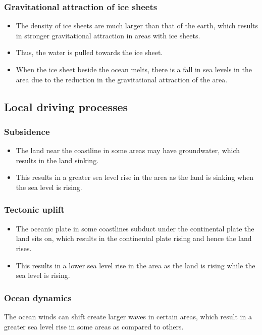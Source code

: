 \documentclass[11pt]{article}
\begin{document}
\newpage
\subsubsection{Gravitational attraction of ice sheets}
\label{sec:org76a1fd2}
\begin{itemize}
\item The density of ice sheets are much larger than that of the earth, which results in stronger gravitational attraction in areas with ice sheets.
\item Thus, the water is pulled towards the ice sheet.
\item When the ice sheet beside the ocean melts, there is a fall in sea levels in the area due to the reduction in the gravitational attraction of the area.
\end{itemize}
\subsection{Local driving processes}
\label{sec:org1d72120}

\subsubsection{Subsidence}
\label{sec:org7d9c431}
\begin{itemize}
\item The land near the coastline in some areas may have groundwater, which results in the land sinking.
\item This results in a greater sea level rise in the area as the land is sinking when the sea level is rising.
\end{itemize}
\subsubsection{Tectonic uplift}
\label{sec:org08e11ec}
\begin{itemize}
\item The oceanic plate in some coastlines subduct under the continental plate the land sits on, which results in the continental plate rising and hence the land rises.
\item This results in a lower sea level rise in the area as the land is rising while the sea level is rising.
\end{itemize}
\subsubsection{Ocean dynamics}
\label{sec:org811ea33}
The ocean winds can shift create larger waves in certain areas, which result in a greater sea level rise in some areas as compared to others.
\end{document}
